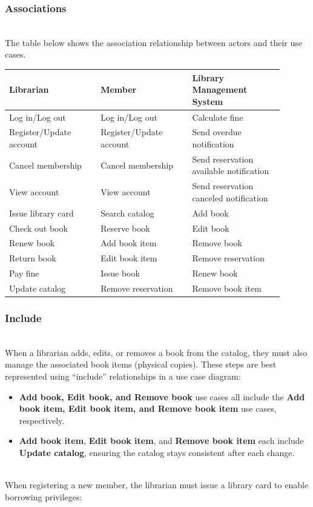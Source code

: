 \subsubsection{Associations}\label{AZuKozZoPAwRed1Jxg87-}
\\
The table below shows the association relationship between actors and their use cases.

\begin{center}
\begin{tabular}{|p{0.3\linewidth}|p{0.3\linewidth}|p{0.3\linewidth}|}
\hline
\textbf{Librarian} & \textbf{Member} & \textbf{Library Management System} \\
\hline
Log in/Log out & Log in/Log out & Calculate fine \\
\hline
Register/Update account & Register/Update account & Send overdue notification \\
\hline
Cancel membership & Cancel membership & Send reservation available notification \\
\hline
View account & View account & Send reservation canceled notification \\
\hline
Issue library card & Search catalog & Add book \\
\hline
Check out book & Reserve book & Edit book \\
\hline
Renew book & Add book item & Remove book \\
\hline
Return book & Edit book item & Remove reservation \\
\hline
Pay fine & Issue book & Renew book \\
\hline
Update catalog & Remove reservation & Remove book item \\
\hline
\end{tabular}
\end{center}


\subsubsection{Include}\label{9wfm14MznDdHSvsYcbvJC}
\\
When a librarian adds, edits, or removes a book from the catalog, they must also manage the associated book items (physical copies). These steps are best represented using ``include'' relationships in a use case diagram:

\begin{itemize}
\item
\protect{}\label{Kp1b_tXwwB7N6PFJZB8ta}
\textbf{Add book, Edit book, and Remove book} use cases all include the \textbf{Add book item, Edit book item, and Remove book item} use cases, respectively.
\item
\protect{}\label{Cdn61g_CTdSxmLGDIRZe1}
\textbf{Add book item}, \textbf{Edit book item}, and \textbf{Remove book item} each include \textbf{Update catalog}, ensuring the catalog stays consistent after each change.
\end{itemize}
\\
When registering a new member, the librarian must issue a library card to enable borrowing privileges:

